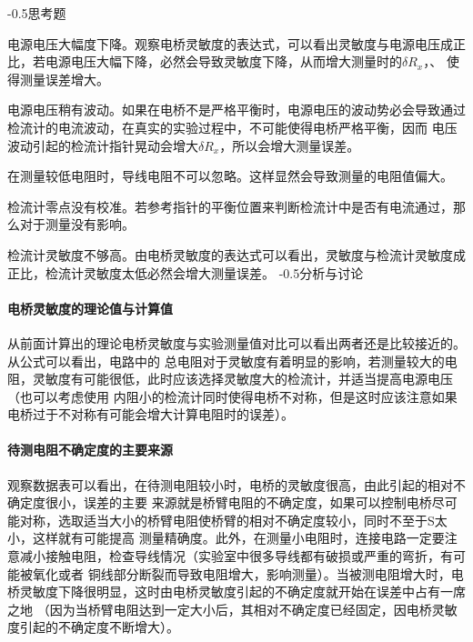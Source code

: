 \documentclass[a4paper]{ctexart}
\makeatletter
\renewcommand{\section}{\@startsection{section}{1}{0mm}
	{-\baselineskip}{0.5\baselineskip}{\bf\leftline}}
\makeatother
\begin{document}
    \section{\large{思考题}}
    \par 
    电源电压大幅度下降。观察电桥灵敏度的表达式，可以看出灵敏度与电源电压成正比，若电源电压大幅下降，必然会导致灵敏度下降，从而增大测量时的$\delta R_{x}$，、
    使得测量误差增大。
    \par 
    电源电压稍有波动。如果在电桥不是严格平衡时，电源电压的波动势必会导致通过检流计的电流波动，在真实的实验过程中，不可能使得电桥严格平衡，因而
    电压波动引起的检流计指针晃动会增大$\delta R_{x}$，所以会增大测量误差。
    \par 
    在测量较低电阻时，导线电阻不可以忽略。这样显然会导致测量的电阻值偏大。
    \par 
    检流计零点没有校准。若参考指针的平衡位置来判断检流计中是否有电流通过，那么对于测量没有影响。
    \par 
    检流计灵敏度不够高。由电桥灵敏度的表达式可以看出，灵敏度与检流计灵敏度成正比，检流计灵敏度太低必然会增大测量误差。
    \section{\large{分析与讨论}}
    \paragraph{电桥灵敏度的理论值与计算值}从前面计算出的理论电桥灵敏度与实验测量值对比可以看出两者还是比较接近的。从公式可以看出，电路中的
    总电阻对于灵敏度有着明显的影响，若测量较大的电阻，灵敏度有可能很低，此时应该选择灵敏度大的检流计，并适当提高电源电压（也可以考虑使用
    内阻小的检流计同时使得电桥不对称，但是这时应该注意如果电桥过于不对称有可能会增大计算电阻时的误差）。
    \paragraph{待测电阻不确定度的主要来源}观察数据表可以看出，在待测电阻较小时，电桥的灵敏度很高，由此引起的相对不确定度很小，误差的主要
    来源就是桥臂电阻的不确定度，如果可以控制电桥尽可能对称，选取适当大小的桥臂电阻使桥臂的相对不确定度较小，同时不至于S太小，这样就有可能提高
    测量精确度。此外，在测量小电阻时，连接电路一定要注意减小接触电阻，检查导线情况（实验室中很多导线都有破损或严重的弯折，有可能被氧化或者
    铜线部分断裂而导致电阻增大，影响测量）。当被测电阻增大时，电桥灵敏度下降很明显，这时由电桥灵敏度引起的不确定度就开始在误差中占有一席之地
    （因为当桥臂电阻达到一定大小后，其相对不确定度已经固定，因电桥灵敏度引起的不确定度不断增大）。
\end{document}
